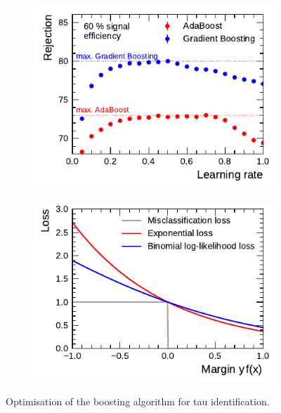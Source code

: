 \begin{figure}[htb]
  \centering
  \begin{subfigure}[t]{0.48\textwidth}
    \centering
    \includegraphics{./figures/bdt_perf/boosting.pdf}
    \label{fig:bdt_boosting_alg}
  \end{subfigure}\hfill
  \begin{subfigure}[t]{0.48\textwidth}
    \centering \includegraphics{./figures/theory/boosting_loss.pdf}
    \label{fig:boosting_loss}
  \end{subfigure}
  \caption{Optimisation of the boosting algorithm for tau identification.}
\end{figure}

